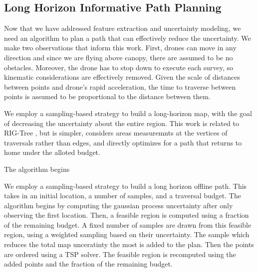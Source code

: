 \subsection{Long Horizon Informative Path Planning}
Now that we have addressed feature extraction and uncertainty modeling, we need an algorithm to plan a path that can effectively reduce the uncertainty. We make two observations that inform this work. First, drones can move in any direction and since we are flying above canopy, there are assumed to be no obstacles. Moreover, the drone has to stop down to execute each survey, so kinematic considerations are effectively removed. Given the scale of distances between points and drone's rapid acceleration, the time to traverse between points is assumed to be proportional to the distance between them.  

We employ a sampling-based strategy to build a long-horizon map, with the goal of decreasing the uncertainty about the entire region. This work is related to RIG-Tree \cite{Hollinger2014Sampling-basedAlgorithms}, but is simpler, considers areas measuremnts at the vertices of traversals rather than edges, and directly optimizes for a path that returns to home under the alloted budget.

The algorithm begins 

We employ a sampling-based strategy to build a long horizon offline path. This takes in an initial location, a number of samples, and a traversal budget. The algorithm begins by computing the gaussian process uncertainty after only observing the first location. Then, a feasible region is computed using a fraction of the remaining budget. A fixed number of samples are drawn from this feasible region, using a weighted sampling based on their uncertainty. The sample which reduces the total map unceratinty the most is added to the plan. Then the points are ordered using a TSP solver. The feasible region is recomputed using the added points and the fraction of the remaining budget.

